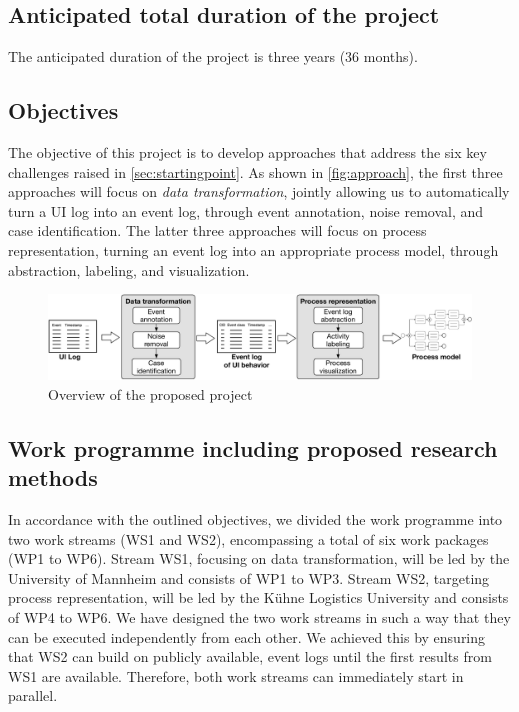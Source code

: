  \subsection{Anticipated total duration of the project}

The anticipated duration of the project is three years (36 months).

\vspace{-1em}
\subsection{Objectives}
\label{sec:objectives}

The objective of this project is to develop approaches that address the six key challenges raised in \autoref{sec:startingpoint}. As shown in \autoref{fig:approach}, the first three approaches will 
focus on \emph{data transformation}, jointly allowing us to automatically turn a UI log into an event log, through event annotation, noise removal, and case identification. The latter three approaches will focus on process representation, turning an event log into an appropriate process model, through  abstraction, labeling, and visualization.

\begin{figure}[h!]
	\centering
	\includegraphics[width=\textwidth]{figures/overview.pdf}
	\caption{Overview of the proposed project}
	\label{fig:approach}
\end{figure}

\subsection{Work programme including proposed research methods}
\label{sec:workprogramme}

 In accordance with the outlined objectives, we divided the work programme into two work streams (WS1 and WS2), encompassing a total of six work packages (WP1 to WP6). Stream WS1, focusing on data transformation, will be led by the University of Mannheim and consists of WP1 to WP3. Stream WS2, targeting process representation, will be led by the Kühne Logistics University and consists of WP4 to WP6. We have designed the two work streams in such a way that they can be executed independently from each other. We achieved this by ensuring that WS2 can build on publicly available,  event logs until the first results from WS1 are available. Therefore, both work streams can immediately start in parallel. 

